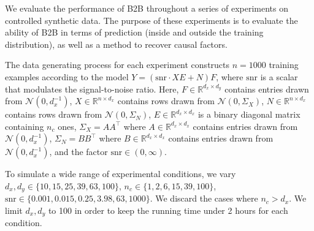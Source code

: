We evaluate the performance of B2B throughout a series of experiments on
controlled synthetic data.
%
The purpose of these experiments is to evaluate the ability of B2B in terms of
prediction (inside and outside the training distribution), as well as a method
to recover causal factors.

The data generating process for each experiment constructs $n=1000$ training examples
according to the model $Y = (\text{snr} \cdot XE + N)F$, where $\text{snr}$ is a
scalar that modulates the signal-to-noise ratio.
%
Here,
    $F \in \mathbb{R}^{d_x \times d_y}$ contains entries drawn from
$\mathcal{N}(0, d_x^{-1})$, $X \in \mathbb{R}^{n \times d_x}$ contains rows
drawn from $\mathcal{N}(0, \Sigma_X)$, $N \in \mathbb{R}^{n \times d_x}$
contains rows drawn from $\mathcal{N}(0, \Sigma_N)$, $E \in \mathbb{R}^{d_x
\times d_x}$ is a binary diagonal matrix containing $n_c$ ones, $\Sigma_X =
AA^\top$ where $A \in \mathbb{R}^{d_x \times d_x}$ contains entries drawn from
$\mathcal{N}(0, d_x^{-1})$, $\Sigma_N = BB^\top$ where $B \in \mathbb{R}^{d_x
\times d_x}$ contains entries drawn from $\mathcal{N}(0, d_x^{-1})$, and the
factor $\text{snr} \in (0, \infty)$.

To simulate a wide range of experimental conditions, we vary $d_x, d_y \in \{ 10, 15, 25, 39, 63, 100 \}$, $n_c \in \{ 1, 2, 6, 15, 39, 100 \}$,
$\text{snr} \in \{ 0.001, 0.015, 0.25, 3.98, 63, 1000 \}$. We discard the cases where $n_c > d_x$. We limit $d_x, d_y$ to 100 in order to keep the running time under 2 hours for each condition.
%

